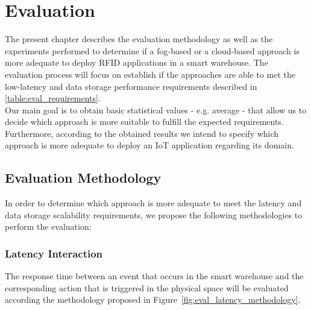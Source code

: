 
\chapter{Evaluation}
\label{chapter:evaluation}
The present chapter describes the evaluation methodology as well as the experiments performed to determine
if a fog-based or a cloud-based approach is more adequate to deploy \gls{RFID} applications in a
smart warehouse. The evaluation process will focus on establish if the approaches are
able to met the low-latency and data storage performance requirements described in \ref{table:eval_requirements}.\\

Our main goal is to obtain basic statistical values - e.g. average - that allow us to decide which
approach is more suitable to fulfill the expected requirements. Furthermore, according to the obtained
results we intend to specify which approach is more adequate to deploy an \gls{IoT} application regarding
its domain.

\section{Evaluation Methodology}
\label{sec:eval_methodology}
In order to determine which approach is more adequate to meet the latency and data storage scalability
requirements, we propose the following methodologies to perform the evaluation:

\subsection{Latency Interaction}
\label{sub:eval_methodology_latency}
The response time between an event that occurs in the smart warehouse and the corresponding action
that is triggered in the physical space will be evaluated according the methodology proposed in
Figure~\ref{fig:eval_latency_methodology}.\\

